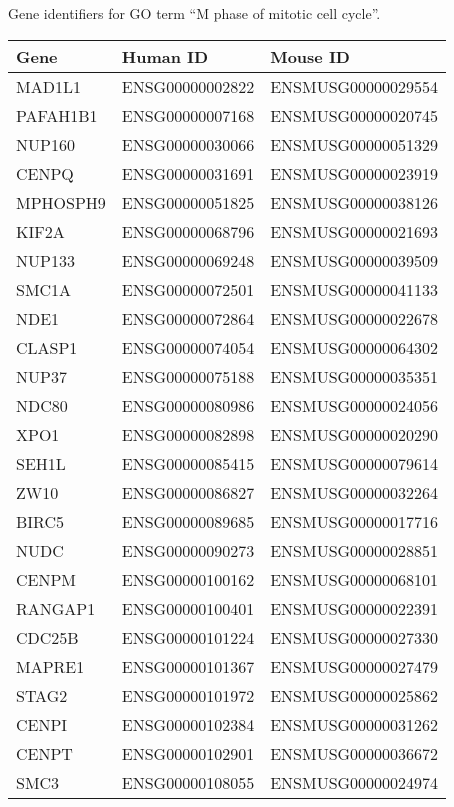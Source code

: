     {Gene identifiers for GO term “M phase of mitotic cell cycle”.}{}

\begin{longtable}{lll}
    \toprule
    Gene & Human ID & Mouse ID \\
    \midrule
    MAD1L1 & ENSG00000002822 & ENSMUSG00000029554 \\
    PAFAH1B1 & ENSG00000007168 & ENSMUSG00000020745 \\
    NUP160 & ENSG00000030066 & ENSMUSG00000051329 \\
    CENPQ & ENSG00000031691 & ENSMUSG00000023919 \\
    MPHOSPH9 & ENSG00000051825 & ENSMUSG00000038126 \\
    KIF2A & ENSG00000068796 & ENSMUSG00000021693 \\
    NUP133 & ENSG00000069248 & ENSMUSG00000039509 \\
    SMC1A & ENSG00000072501 & ENSMUSG00000041133 \\
    NDE1 & ENSG00000072864 & ENSMUSG00000022678 \\
    CLASP1 & ENSG00000074054 & ENSMUSG00000064302 \\
    NUP37 & ENSG00000075188 & ENSMUSG00000035351 \\
    NDC80 & ENSG00000080986 & ENSMUSG00000024056 \\
    XPO1 & ENSG00000082898 & ENSMUSG00000020290 \\
    SEH1L & ENSG00000085415 & ENSMUSG00000079614 \\
    ZW10 & ENSG00000086827 & ENSMUSG00000032264 \\
    BIRC5 & ENSG00000089685 & ENSMUSG00000017716 \\
    NUDC & ENSG00000090273 & ENSMUSG00000028851 \\
    CENPM & ENSG00000100162 & ENSMUSG00000068101 \\
    RANGAP1 & ENSG00000100401 & ENSMUSG00000022391 \\
    CDC25B & ENSG00000101224 & ENSMUSG00000027330 \\
    MAPRE1 & ENSG00000101367 & ENSMUSG00000027479 \\
    STAG2 & ENSG00000101972 & ENSMUSG00000025862 \\
    CENPI & ENSG00000102384 & ENSMUSG00000031262 \\
    CENPT & ENSG00000102901 & ENSMUSG00000036672 \\
    SMC3 & ENSG00000108055 & ENSMUSG00000024974 \\

\end{longtable}
